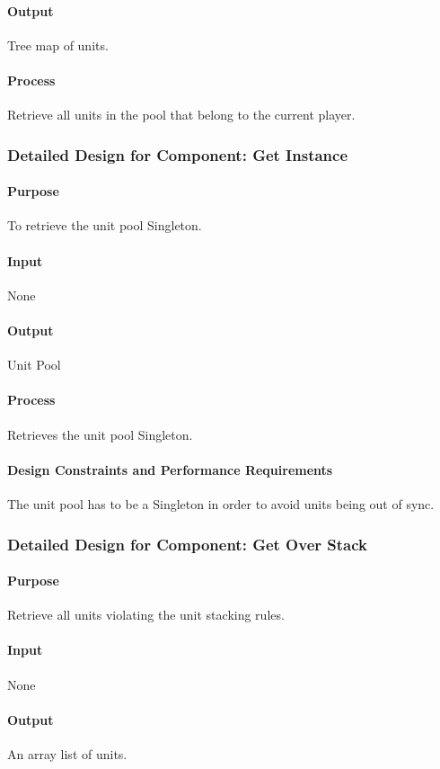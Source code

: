 \documentclass[12pt,a4paper,titlepage]{article}
\begin{document}
\paragraph{Output} Tree map of units.
\paragraph{Process} Retrieve all units in the pool that belong to the current player.

\subsubsection{Detailed Design for Component: Get Instance}
\paragraph{Purpose} To retrieve the unit pool Singleton.
\paragraph{Input} None
\paragraph{Output} Unit Pool
\paragraph{Process} Retrieves the unit pool Singleton.
\paragraph{Design Constraints and Performance Requirements} The unit pool has to be a Singleton in order to avoid units being out of sync.

\subsubsection{Detailed Design for Component: Get Over Stack}
\paragraph{Purpose} Retrieve all units violating the unit stacking rules.
\paragraph{Input} None
\paragraph{Output} An array list of units.
\end{document}
